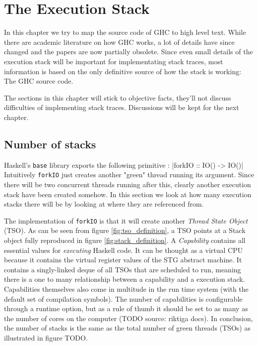 \chapter{The Execution Stack}

In this chapter we try to map the source code of GHC to high level text.
While there are academic literature on how GHC works, a lot of details have
since changed and the papers are now partially obsolete. Since even
small details of the execution stack will be important for implementating stack traces,
most information is based on the only definitive source of how the
stack is working: The GHC source code.

The sections in this chapter will stick to objective facts,
they'll not discuss difficulties of implementing stack traces.
Discussions will be kept for the next chapter.

\section{Number of stacks}

Haskell's \texttt{base} library exports the following primitive \cite{base_forkIO}:
|forkIO :: IO() -> IO()|
Intuitively \texttt{forkIO} just creates another "green" thread running its argument.
Since there will be two concurrent threads running after this, clearly
another execution stack have been created somehow. In this section we
look at how many execution stacks there will be by looking at
where they are referenced from.

The implementation of \texttt{forkIO} is
that it will create another \emph{Thread State Object} (TSO). As
can be seen from figure \ref{fig:tso_definition}, a TSO points at a
Stack object fully reproduced in figure \ref{fig:stack_definition}. A
\emph{Capability} contains all essential values for \emph{executing}
Haskell code. It can be thought as a virtual CPU because it contains
the virtual register values of the STG abstract machine. It contains
a singly-linked deque of all TSOs that are scheduled to run, meaning
there is a one to many relationship between a capability and a execution
stack. Capabilities themselves also come in multitude in the run time
system (with the default set of compilation symbols). The number of
capabilities is configurable through a runtime option, but as a rule of
thumb it should be set to as many as the number of cores on the computer
(TODO source: riktiga docs). In conclusion, the number of stacks is
the same as the total number of green threads (TSOs) as illustrated in
figure TODO.

